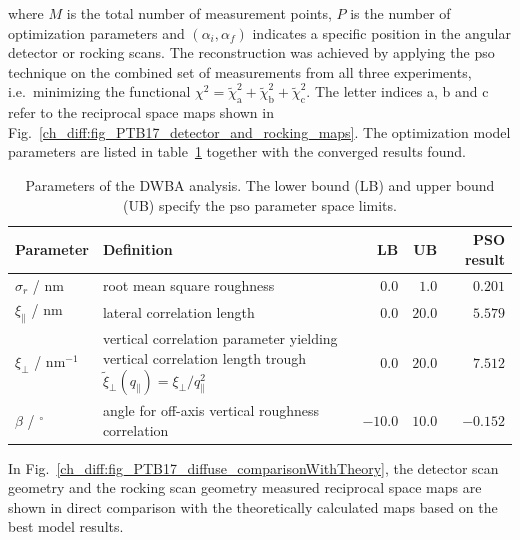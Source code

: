 where $M$ is the total number of measurement points, $P$ is the number of optimization parameters and $(\alpha_i, \alpha_f)$ indicates a specific position in the angular detector or rocking scans. The reconstruction was achieved by applying the \gls{pso} technique on the combined set of measurements from all three experiments, i.e.~minimizing the functional $\chi^2 = \tilde{\chi}^2_\text{a} + \tilde{\chi}^2_\text{b} + \tilde{\chi}^2_\text{c}$. The letter indices a, b and c refer to the reciprocal space maps shown in Fig.~\ref{ch_diff:fig_PTB17_detector_and_rocking_maps}. The optimization model parameters are listed in table~\ref{ch_diff:tbl_PTB17_diffuse_optimization_limits_and_results} together with the converged results found.
\begin{table}
\centering
\caption{Parameters of the DWBA analysis. The lower bound (LB) and upper bound (UB) specify the \gls{pso} parameter space limits.}
\label{ch_diff:tbl_PTB17_diffuse_optimization_limits_and_results}
\begin{tabularx}{\textwidth}{@{}lXrrr@{}}
\toprule
Parameter & Definition & LB & UB & PSO result\\ \midrule
$\sigma_r$ / nm & root mean square roughness & $0.0$& $1.0$ & $0.201$\\ 
$\xi_\parallel$ / nm & lateral correlation length & $0.0$& $20.0$ & $5.579$\\ 
$\xi_\perp$ / nm$^{-1}$ &vertical correlation parameter yielding vertical correlation length trough $\tilde{\xi}_\perp(q_\parallel) = \xi_\perp/q_\parallel^2$ &$0.0$ & $20.0$ & $7.512$\\
$\beta$ / $^\circ$&angle for off-axis vertical roughness correlation& $-10.0$ & $10.0$ & $-0.152$\\ 
 \bottomrule
\end{tabularx}
\end{table}
In Fig.~\ref{ch_diff:fig_PTB17_diffuse_comparisonWithTheory}, the detector scan geometry and the rocking scan geometry measured reciprocal space maps are shown in direct comparison with the theoretically calculated maps based on the best model results. 
